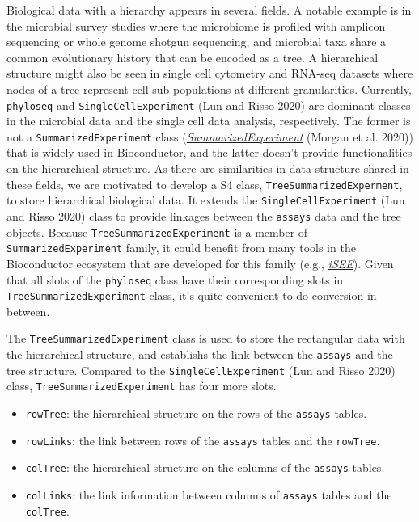 \documentclass[]{article}
\providecommand{\tightlist}{%
  \setlength{\itemsep}{0pt}\setlength{\parskip}{0pt}}
\begin{document}
Biological data with a hierarchy appears in several fields. A notable example is in the microbial survey studies where the microbiome is profiled with amplicon sequencing or whole genome shotgun sequencing, and microbial taxa share a common evolutionary history that can be encoded as a tree. A hierarchical structure might also be seen in single cell cytometry and RNA-seq datasets where nodes of a tree represent cell sub-populations at different granularities. Currently,
\texttt{phyloseq} and \texttt{SingleCellExperiment} (Lun and Risso 2020) are dominant classes in the microbial data and the single cell data analysis, respectively. The former is not a \texttt{SummarizedExperiment} class (\emph{\href{https://bioconductor.org/packages/3.11/SummarizedExperiment}{SummarizedExperiment}} (Morgan et al. 2020)) that is widely used in Bioconductor, and the latter doesn't provide functionalities on the hierarchical structure. As there are similarities in data structure shared in these fields, we are motivated to develop a S4 class, \texttt{TreeSummarizedExperment}, to store hierarchical biological data. It extends the \texttt{SingleCellExperiment} (Lun and Risso 2020) class to provide linkages between the \texttt{assays} data and the tree objects. Because \texttt{TreeSummarizedExperiment} is a member of \texttt{SummarizedExperiment} family, it could benefit from many tools in the Bioconductor ecosystem that are developed for this family (e.g., \emph{\href{https://bioconductor.org/packages/3.11/iSEE}{iSEE}}). Given that all slots of the \texttt{phyloseq} class have their corresponding slots in \texttt{TreeSummarizedExperiment} class, it's quite convenient to do conversion in between.

The \texttt{TreeSummarizedExperiment} class is used to store the rectangular
data with the hierarchical structure, and establishs the link between the \texttt{assays} and the tree structure. Compared to the \texttt{SingleCellExperiment} (Lun and Risso 2020) class, \texttt{TreeSummarizedExperiment} has
four more slots.

\begin{itemize}
\tightlist
\item
  \texttt{rowTree}: the hierarchical structure on the rows of the \texttt{assays} tables.
\item
  \texttt{rowLinks}: the link between rows of the \texttt{assays} tables and the \texttt{rowTree}.
\item
  \texttt{colTree}: the hierarchical structure on the columns of the \texttt{assays} tables.
\item
  \texttt{colLinks}: the link information between columns of \texttt{assays} tables and the
  \texttt{colTree}.
\end{itemize}
\end{document}
